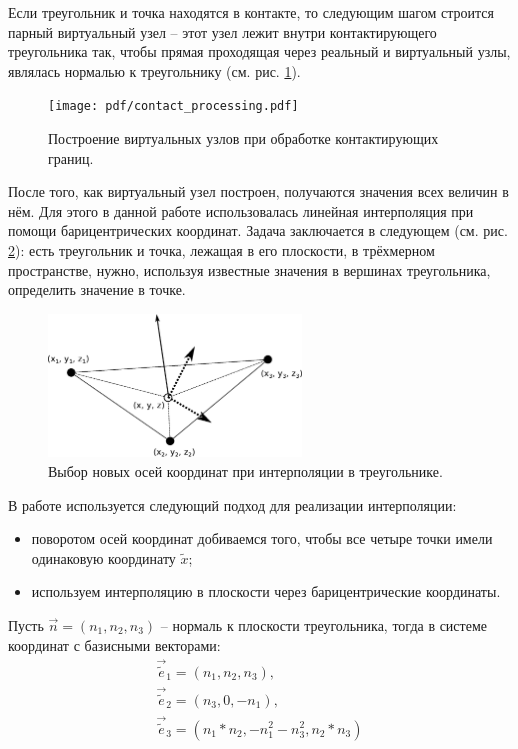 Если треугольник и точка находятся в контакте, то следующим шагом строится парный виртуальный узел -- этот узел лежит внутри контактирующего треугольника так, чтобы прямая проходящая через реальный и виртуальный узлы, являлась нормалью к треугольнику (см. рис. \ref{pic:contact_processing}).
\begin{figure}[htp]
\centering
\texttt{[image: pdf/contact\_processing.pdf]}
\caption{Построение виртуальных узлов при обработке контактирующих границ.}
\label{pic:contact_processing}
\end{figure}
После того, как виртуальный узел построен, получаются значения всех величин в нём. Для этого в данной работе использовалась линейная интерполяция при помощи барицентрических координат. Задача заключается в следующем (см. рис. \ref{pic:triangle_interpolation}): есть треугольник и точка, лежащая в его плоскости, в трёхмерном пространстве, нужно, используя известные значения в вершинах треугольника, определить значение в точке.
\begin{figure}[htp]
\centering
\includegraphics[width=0.6\textwidth]{eps/triangle_interpolation.eps}
\caption{Выбор новых осей координат при интерполяции в треугольнике.}
\label{pic:triangle_interpolation}
\end{figure}
В работе используется следующий подход для реализации интерполяции:
\begin{itemize}
	\item поворотом осей координат добиваемся того, чтобы все четыре точки имели одинаковую координату $\tilde{x}$;
	\item используем интерполяцию в плоскости через барицентрические координаты.
\end{itemize}
Пусть $\vec{n}=(n_1,n_2,n_3)$ -- нормаль к плоскости треугольника, тогда в системе координат с базисными векторами:
\begin{eqnarray}
\label{eq:new_coords}
\vec{\tilde{e}}_1=(n_1, n_2, n_3), \nonumber \\
\vec{\tilde{e}}_2=(n_3, 0, -n_1), \nonumber \\
\vec{\tilde{e}}_3=(n_1*n_2, -n_1^2-n_3^2, n_2*n_3)
\end{eqnarray}
